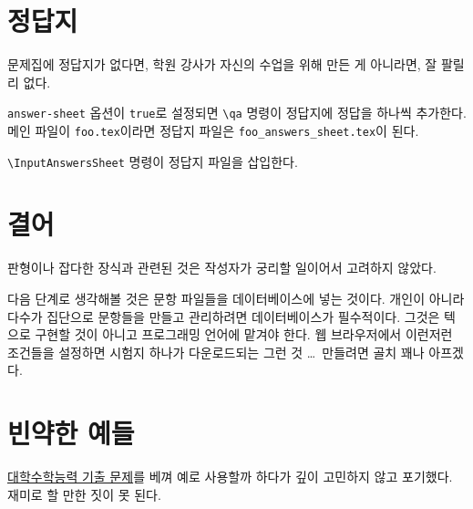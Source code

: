 \documentclass[a4paper]{oblivoir}
\begin{document}
\begin{boxedverbatim}
\end{boxedverbatim}

\section{정답지}

문제집에 정답지가 없다면, 학원 강사가 자신의 수업을 위해 만든 게 아니라면, 잘 팔릴 리 없다.

\begin{boxedverbatim}
\InputAnswersSheet
\end{boxedverbatim}

\texttt{answer-sheet} 옵션이 \texttt{true}로 설정되면 \verb|\qa| 명령이 정답지에 정답을 하나씩 추가한다.
메인 파일이 \texttt{foo.tex}이라면 정답지 파일은 \verb|foo_answers_sheet.tex|이 된다.

\verb|\InputAnswersSheet| 명령이 정답지 파일을 삽입한다.

\section{결어}

판형이나 잡다한 장식과 관련된 것은 작성자가 궁리할 일이어서 고려하지 않았다.

다음 단계로 생각해볼 것은 문항 파일들을 데이터베이스에 넣는 것이다.
개인이 아니라 다수가 집단으로 문항들을 만들고 관리하려면 데이터베이스가 필수적이다.
그것은 텍으로 구현할 것이 아니고 프로그래밍 언어에 맡겨야 한다.
웹 브라우저에서 이런저런 조건들을 설정하면 시험지 하나가 다운로드되는 그런 것 \ldots\ 만들려면 골치 꽤나 아프겠다.

\section{빈약한 예들}

\href{https://www.suneung.re.kr/boardCnts/list.do?boardID=1500234&m=0403&s=suneung}{대학수학능력 기출 문제}를 베껴 예로 사용할까 하다가 깊이 고민하지 않고 포기했다. 
재미로 할 만한 짓이 못 된다.

\begin{boxedverbatim}
\end{boxedverbatim}
\end{document}
